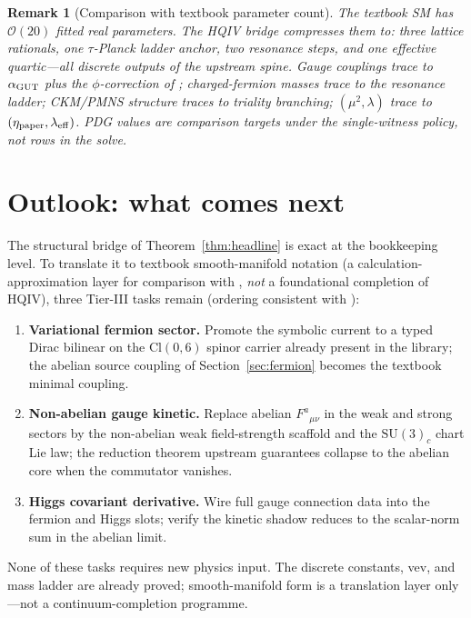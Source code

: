 \documentclass[11pt]{amsart}
\newtheorem{remark}[theorem]{Remark}
\begin{document}
\begin{remark}[Comparison with textbook parameter count]
\label{rem:param-count}
The textbook SM has $\mathcal{O}(20)$ fitted real parameters. The HQIV
bridge compresses them to: three lattice rationals, one $\tau$-Planck ladder
anchor, two resonance steps, and one effective quartic---all discrete outputs
of the upstream spine. Gauge couplings trace to $\alpha_{\rm GUT}$ plus the
$\phi$-correction of \cite{hqiv-oct-action-paper}; charged-fermion masses
trace to the resonance ladder; CKM/PMNS structure traces to triality
branching; $(\mu^2,\lambda)$ trace to $(\eta_{\rm paper},\lambda_{\rm eff})$.
PDG values are comparison targets under the single-witness policy, not rows
in the solve.
\end{remark}

\section{Outlook: what comes next}
\label{sec:outlook}

The structural bridge of Theorem~\ref{thm:headline} is exact at the
bookkeeping level. To translate it to textbook smooth-manifold notation (a
calculation-approximation layer for comparison with
\cite{peskin1995,schwartz2014}, \emph{not} a foundational completion of HQIV),
three Tier-III tasks remain (ordering consistent with
\cite{hqiv-oct-action-paper}):

\begin{enumerate}[leftmargin=2em]
\item \textbf{Variational fermion sector.} Promote the symbolic current to a
  typed Dirac bilinear on the Cl$(0,6)$ spinor carrier already present in the
  library; the abelian source coupling of Section~\ref{sec:fermion} becomes
  the textbook minimal coupling.
\item \textbf{Non-abelian gauge kinetic.} Replace abelian $F^a{}_{\mu\nu}$ in
  the weak and strong sectors by the non-abelian weak field-strength scaffold
  and the $\mathrm{SU}(3)_c$ chart Lie law; the reduction theorem upstream
  guarantees collapse to the abelian core when the commutator vanishes.
\item \textbf{Higgs covariant derivative.} Wire full gauge connection data into
  the fermion and Higgs slots; verify the kinetic shadow reduces to the
  scalar-norm sum in the abelian limit.
\end{enumerate}

None of these tasks requires new physics input. The discrete constants, vev,
and mass ladder are already proved; smooth-manifold form is a translation
layer only---not a continuum-completion programme.
\end{document}
